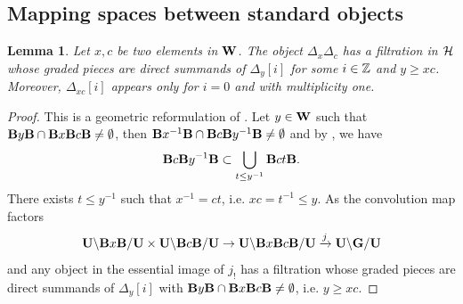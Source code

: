 \documentclass[article, 10pt, oneside, reqno]{amsart}
\theoremstyle{plain}
\newtheorem{lem}[thm]{Lemma}
\theoremstyle{definition}
\theoremstyle{remark}
\begin{document}
\subsection{Mapping spaces between standard objects}

\begin{lem}\label{lem:filtration-product-of-Delta}
Let $x,c$ be two elements in $\mathbf{W}$. The object $\Delta_x\Delta_c$ has a filtration in $\mathcal{H}$ whose graded pieces are direct summands of $\Delta_y[i]$ for some $i \in \mathbb{Z}$ and $y \geq xc$. Moreover, $\Delta_{xc}[i]$ appears only for $i = 0$ and with multiplicity one. 
\end{lem}

\begin{proof}
This is a geometric reformulation of \cite[Lemma 8.9]{DigneMichelEndomorphism}. Let $y \in \mathbf{W}$ such that $\mathbf{B} y \mathbf{B} \cap \mathbf{B} x \mathbf{B} c \mathbf{B} \neq \emptyset$, then $\mathbf{B} x^{-1}\mathbf{B} \cap \mathbf{B} c\mathbf{B} y^{-1}\mathbf{B} \neq \emptyset$ and by \cite[Chapitre IV, Section 2, Lemme 1]{BourbakiLie456}, we have 
$$\mathbf{B} c\mathbf{B} y^{-1}\mathbf{B}  \subset \bigcup_{t \leq y^{-1}} \mathbf{B} ct \mathbf{B}.$$
There exists $t \leq y^{-1}$ such that $x^{-1} = ct$, i.e. $xc = t^{-1} \leq y$. 
As the convolution map factors 
$$\mathbf{U}\backslash \mathbf{B} x \mathbf{B} /\mathbf{U} \times \mathbf{U} \backslash \mathbf{B} c \mathbf{B} /\mathbf{U} \to \mathbf{U}\backslash \mathbf{B} x \mathbf{B} c \mathbf{B} /\mathbf{U} \xrightarrow{j} \mathbf{U} \backslash \mathbf{G}/\mathbf{U}$$
and any object in the essential image of $j_!$ has a filtration whose graded pieces are direct summands of $\Delta_y[i]$ with $\mathbf{B} y \mathbf{B} \cap \mathbf{B} x \mathbf{B} c \mathbf{B} \neq \emptyset$, i.e. $y \geq xc$.


\end{proof}
\end{document}
